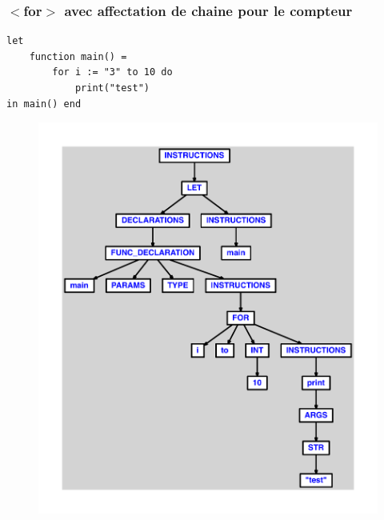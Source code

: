 \documentclass{article}
\begin{document}
\subsubsection{$ < $for$ > $ avec affectation de chaine pour le compteur}
\begin{lstlisting}
let
	function main() =
		for i := "3" to 10 do
			print("test")
in main() end
\end{lstlisting}
\newpage
\begin{figure}[H]
\centering
\includegraphics[max width=\textwidth]{ast/ast_192.pdf}
\end{figure}
\newpage
\end{document}
